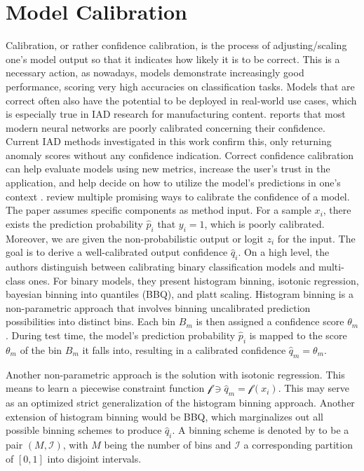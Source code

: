 \section{Model Calibration}
\label{sec:modelcalibration}
Calibration, or rather confidence calibration, is the process of adjusting/scaling one's model output so that it indicates how likely it is to be correct. This is a necessary action, as nowadays, 
models demonstrate increasingly good performance, scoring very high accuracies on classification tasks. Models that are correct often also have the potential to be deployed in 
real-world use cases, which is especially true in IAD research for manufacturing content. \cite{Guo_2017_tempscalingetc} reports that most modern neural networks are poorly calibrated concerning their confidence. Current IAD methods investigated in this work confirm this, only returning anomaly scores without any confidence indication. Correct confidence calibration can help evaluate 
models using new metrics, increase the user's trust in the application, and help decide on how to utilize the model's predictions in one's context \cite{whyUncertaintyIsImportant}. 
\newline
\cite{Guo_2017_tempscalingetc} review multiple promising ways to calibrate the confidence of a model. The paper assumes specific components as method input. For a sample $x_i$, there exists the 
prediction probability $\hat{p}_i$ that $y_i = 1$, which is poorly calibrated. Moreover, we are given the non-probabilistic output or logit $z_i$ for the input. The goal is to derive a 
well-calibrated output confidence $\hat{q}_i$.
On a high level, the authors distinguish between calibrating binary classification models and multi-class 
ones. For binary models, they present histogram binning, isotonic regression, bayesian binning into quantiles (BBQ), and platt scaling. 
Histogram binning is a non-parametric approach that involves binning uncalibrated prediction possibilities into distinct bins. Each bin $B_m$ is then assigned a confidence score $\theta _m$. During 
test time, the model's prediction probability $\hat{p}_i$ is mapped to the score $\theta _m$ of the bin $B_m$ it falls into, resulting in a calibrated confidence $\hat{q}_m = \theta _m$.


Another non-parametric approach is the solution with isotonic regression. This means to learn a piecewise constraint function $\mathcal{f} \ni \hat{q}_m = \mathcal{f}(x_i)$. This may serve as an 
optimized strict generalization of the histogram binning approach.
Another extension of histogram binning would be BBQ, which marginalizes out all possible binning schemes to produce $\hat{q}_i$. A binning scheme 
is denoted by \cite{Guo_2017_tempscalingetc} to be a pair $(M, \mathcal{I})$, with $M$ being the number of bins and $\mathcal{I}$ a corresponding partition of $[0, 1]$ into disjoint intervals. 


